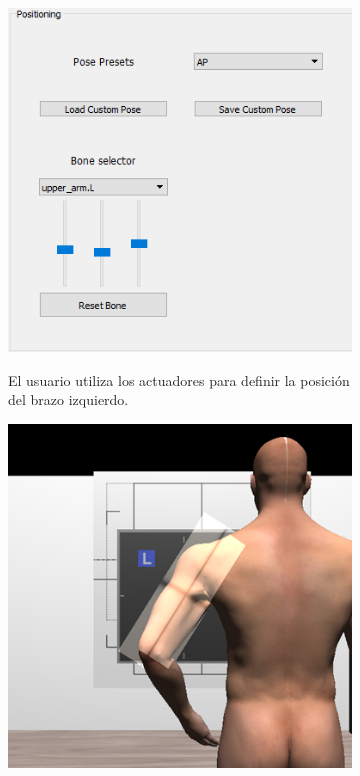 

\begin{figure}[ht]
    \begin{subfigure}[b]{0.45\linewidth}
        \centering
        {\includegraphics[width=\linewidth]{IMG/PoseUI.png}}
        \caption{El usuario utiliza los actuadores para definir la posición del brazo izquierdo. \label{subfig:position}}
    \end{subfigure}
    \null\hfill
     \begin{subfigure}[b]{0.45\linewidth}
        \centering
        {\includegraphics[width=\linewidth]{IMG/PoseArm.png}}

\end{subfigure}
\end{figure}
